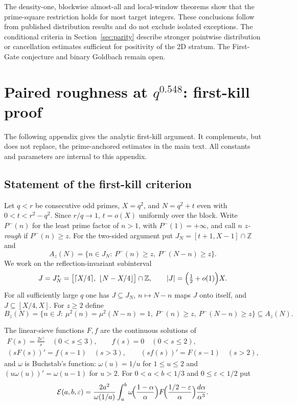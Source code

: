 \documentclass[final,11pt]{elsarticle}
\theoremstyle{definition}
\theoremstyle{remark}
\newcommand{\E}{\mathcal E}
\numberwithin{equation}{section}
\begin{document}
The density-one, blockwise almost-all and local-window theorems show that the prime-square restriction holds for most target integers. These conclusions follow from published distribution results and do not exclude isolated exceptions. The conditional criteria in Section~\ref{sec:parity} describe stronger pointwise distribution or cancellation estimates sufficient for positivity of the 2D stratum. The First-Gate conjecture and binary Goldbach remain open.

\appendix
\section{Paired roughness at \texorpdfstring{$q^{0.548}$}{q to the 0.548}: first-kill proof}\label{app:SP-setting}
The following appendix gives the analytic first-kill argument. It complements, but does not replace,
the prime-anchored estimates in the main text. All constants and parameters
are internal to this appendix.

\subsection{Statement of the first-kill criterion}\label{sp:sec:setting}

Let $q<r$ be consecutive odd primes, $X=q^2$, and $N=q^2+t$ even with
$0<t<r^2-q^2$. Since $r/q\to1$, $t=o(X)$ uniformly over the block. Write
$P^-(n)$ for the least prime factor of $n>1$, with $P^-(1)=+\infty$, and call
$n$ \emph{$z$-rough} if $P^-(n)\ge z$. For the two-sided argument put
$J_N=[t+1,X-1]\cap\mathbb Z$ and
\[
 A_z(N)=\{n\in J_N:\ P^-(n)\ge z,\ P^-(N-n)\ge z\}.
\]
We work on the reflection-invariant subinterval
\begin{equation}\label{sp:eq:interval}
 J=J_N^*=\bigl[\lceil X/4\rceil,\ \lfloor N-X/4\rfloor\bigr]\cap\mathbb Z,
 \qquad |J|=\Bigl(\tfrac12+o(1)\Bigr)X .
\end{equation}
For all sufficiently large $q$ one has $J\subseteq J_N$, $n\mapsto N-n$ maps
$J$ onto itself, and $J\subseteq[X/4,X]$. For $z\ge2$ define
\begin{equation}\label{sp:eq:paired}
 B_z(N)=\bigl\{n\in J:\ \mu^2(n)=\mu^2(N-n)=1,\ P^-(n)\ge z,\ P^-(N-n)\ge z\bigr\}
 \subseteq A_z(N).
\end{equation}

The linear-sieve functions $F,f$ are the continuous solutions of
\begin{gather*}
 F(s)=\frac{2e^\gamma}{s}\quad(0<s\le3),\qquad f(s)=0\quad(0<s\le2),\\
 (sF(s))'=f(s-1)\quad(s>3),\qquad (sf(s))'=F(s-1)\quad(s>2),
\end{gather*}
and $\omega$ is Buchstab's function: $\omega(u)=1/u$ for $1\le u\le2$ and
$(u\omega(u))'=\omega(u-1)$ for $u>2$. For $0<a<b<1/3$ and $0\le\varepsilon<1/2$
put
\begin{equation}\label{sp:eq:E}
 \E(a,b,\varepsilon)=\frac{2a^2}{\omega(1/a)}\int_a^b
 \omega\!\Bigl(\frac{1-\alpha}{\alpha}\Bigr)
 F\!\Bigl(\frac{1/2-\varepsilon}{\alpha}\Bigr)\frac{d\alpha}{\alpha^3}.
\end{equation}
\end{document}
